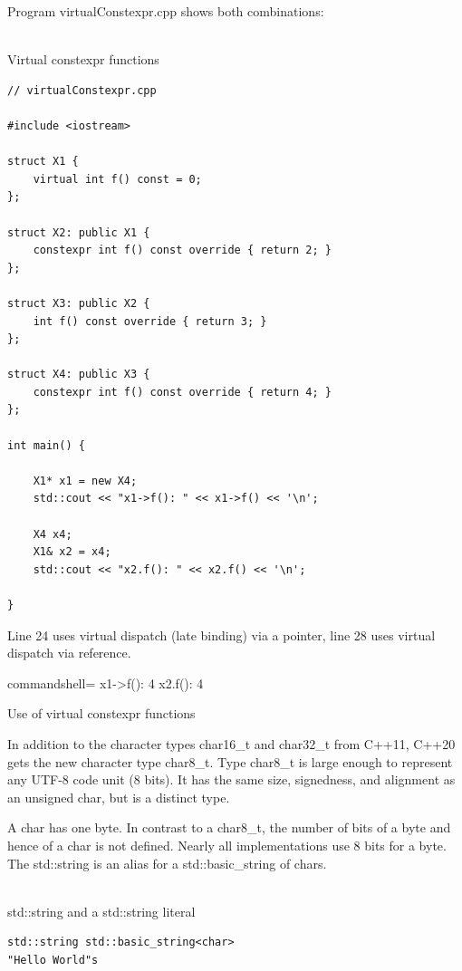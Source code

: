 Program virtualConstexpr.cpp shows both combinations:

\hspace*{\fill} \\ %
\noindent
Virtual constexpr functions
\begin{lstlisting}[style=styleCXX]
// virtualConstexpr.cpp

#include <iostream>

struct X1 {
	virtual int f() const = 0;
};

struct X2: public X1 {
	constexpr int f() const override { return 2; }
};

struct X3: public X2 {
	int f() const override { return 3; }
};

struct X4: public X3 {
	constexpr int f() const override { return 4; }
};

int main() {
	
	X1* x1 = new X4;
	std::cout << "x1->f(): " << x1->f() << '\n';
	
	X4 x4;
	X1& x2 = x4;
	std::cout << "x2.f(): " << x2.f() << '\n';

}
\end{lstlisting}

Line 24 uses virtual dispatch (late binding) via a pointer, line 28 uses virtual dispatch via reference.

\begin{tcblisting}{commandshell={}}
x1->f(): 4
x2.f(): 4
\end{tcblisting}

\begin{center}
Use of virtual constexpr functions
\end{center}


In addition to the character types char16\_t and char32\_t from C++11, C++20 gets the new character type char8\_t. Type char8\_t is large enough to represent any UTF-8 code unit (8 bits). It has the same size, signedness, and alignment as an unsigned char, but is a distinct type.

\begin{tcolorbox}[breakable,enhanced jigsaw,colback=blue!5!white,colframe=blue!75!black,title={char versus char8\_t}]
A char has one byte. In contrast to a char8\_t, the number of bits of a byte and hence of a char is not defined. Nearly all implementations use 8 bits for a byte. The std::string is an alias for a std::basic\_string of chars.

\hspace*{\fill} \\ %
\noindent
std::string and a std::string literal
\begin{lstlisting}[style=styleCXX]
std::string std::basic_string<char>
"Hello World"s
\end{lstlisting}
\end{tcolorbox}

